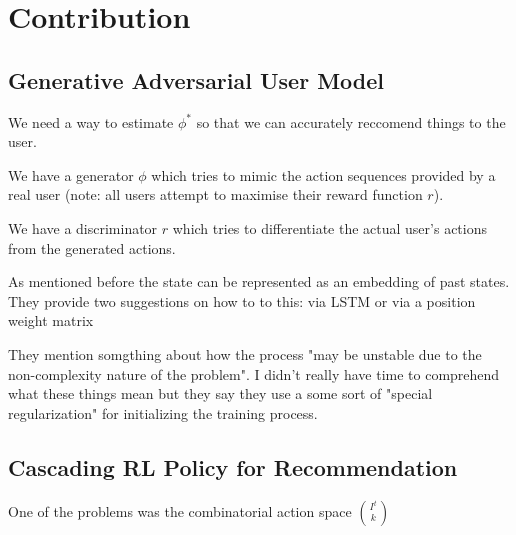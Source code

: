 \documentclass{article}
\begin{document}
    \section{Contribution}

    \subsection{Generative Adversarial User Model}
    We need a way to estimate $\phi ^*$ so that we can accurately reccomend things to the user.

    We have a generator $\phi$ which tries to mimic the action sequences provided by a real user (note: all users attempt to maximise their reward function $r$).

    We have a discriminator $r$ which tries to differentiate the actual user's actions from the generated actions.

    As mentioned before the state can be represented as an embedding of past states. They provide two suggestions on how to to this: via LSTM or via a position weight matrix

    They mention somgthing about how the process "may be unstable due to the non-complexity nature of the problem". I didn't really have time to comprehend what these things mean but they say they use a some sort of "special regularization" for initializing the training process.

    \subsection{Cascading RL Policy for Recommendation}

    One of the problems was the combinatorial action space ${I^t \choose k}$


    
\end{document}
